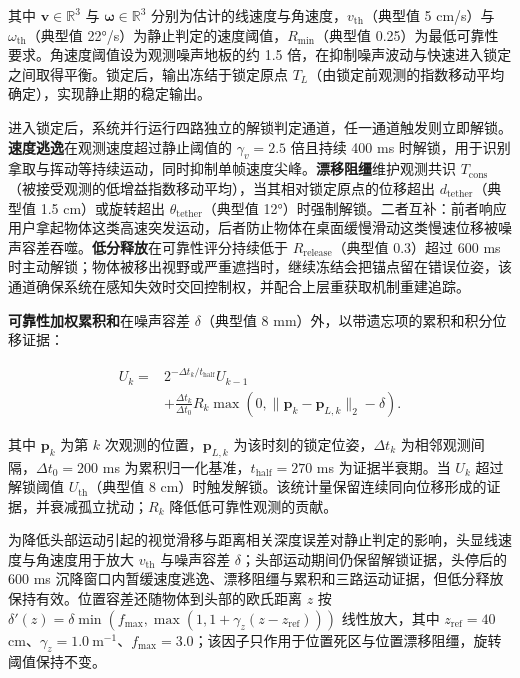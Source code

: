 \documentclass[review]{vgtc}
\begin{document}
其中 $\mathbf{v} \in \mathbb{R}^3$ 与 $\mathbf{\omega} \in \mathbb{R}^3$ 分别为估计的线速度与角速度，$v_{\mathrm{th}}$（典型值 5 cm/s）与 $\omega_{\mathrm{th}}$（典型值 22°/s）为静止判定的速度阈值，$R_{\mathrm{min}}$（典型值 0.25）为最低可靠性要求。角速度阈值设为观测噪声地板的约 1.5 倍，在抑制噪声波动与快速进入锁定之间取得平衡。锁定后，输出冻结于锁定原点 $T_L$（由锁定前观测的指数移动平均确定），实现静止期的稳定输出。

进入锁定后，系统并行运行四路独立的解锁判定通道，任一通道触发则立即解锁。\textbf{速度逃逸}在观测速度超过静止阈值的 $\gamma_v = 2.5$ 倍且持续 400 ms 时解锁，用于识别拿取与挥动等持续运动，同时抑制单帧速度尖峰。\textbf{漂移阻缰}维护观测共识 $T_{\mathrm{cons}}$（被接受观测的低增益指数移动平均），当其相对锁定原点的位移超出 $d_{\mathrm{tether}}$（典型值 1.5 cm）或旋转超出 $\theta_{\mathrm{tether}}$（典型值 12°）时强制解锁。二者互补：前者响应用户拿起物体这类高速突发运动，后者防止物体在桌面缓慢滑动这类慢速位移被噪声容差吞噬。\textbf{低分释放}在可靠性评分持续低于 $R_{\mathrm{release}}$（典型值 0.3）超过 600 ms 时主动解锁；物体被移出视野或严重遮挡时，继续冻结会把锚点留在错误位姿，该通道确保系统在感知失效时交回控制权，并配合上层重获取机制重建追踪。

\textbf{可靠性加权累积和}在噪声容差 $\delta$（典型值 8 mm）外，以带遗忘项的累积和积分位移证据：

\begin{equation}
\begin{aligned}
U_k ={}& 2^{-\Delta t_k/t_{\mathrm{half}}}U_{k-1} \\
&+ \frac{\Delta t_k}{\Delta t_0}R_k
\max\!\left(0,\lVert \mathbf{p}_k-\mathbf{p}_{L,k}\rVert_2-\delta\right).
\end{aligned}
\label{eq:cusum}
\end{equation}


其中 $\mathbf{p}_k$ 为第 $k$ 次观测的位置，$\mathbf{p}_{L,k}$ 为该时刻的锁定位姿，$\Delta t_k$ 为相邻观测间隔，$\Delta t_0 = 200$ ms 为累积归一化基准，$t_{\mathrm{half}} = 270$ ms 为证据半衰期。当 $U_k$ 超过解锁阈值 $U_{\mathrm{th}}$（典型值 8 cm）时触发解锁。该统计量保留连续同向位移形成的证据，并衰减孤立扰动；$R_k$ 降低低可靠性观测的贡献。

为降低头部运动引起的视觉滑移与距离相关深度误差对静止判定的影响，头显线速度与角速度用于放大 $v_{\mathrm{th}}$ 与噪声容差 $\delta$；头部运动期间仍保留解锁证据，头停后的 600 ms 沉降窗口内暂缓速度逃逸、漂移阻缰与累积和三路运动证据，但低分释放保持有效。位置容差还随物体到头部的欧氏距离 $z$ 按 $\delta'(z) = \delta \min(f_{\mathrm{max}}, \max(1, 1 + \gamma_z (z - z_{\mathrm{ref}})))$ 线性放大，其中 $z_{\mathrm{ref}} = 40$ cm、$\gamma_z = 1.0~\mathrm{m}^{-1}$、$f_{\mathrm{max}} = 3.0$；该因子只作用于位置死区与位置漂移阻缰，旋转阈值保持不变。
\end{document}
